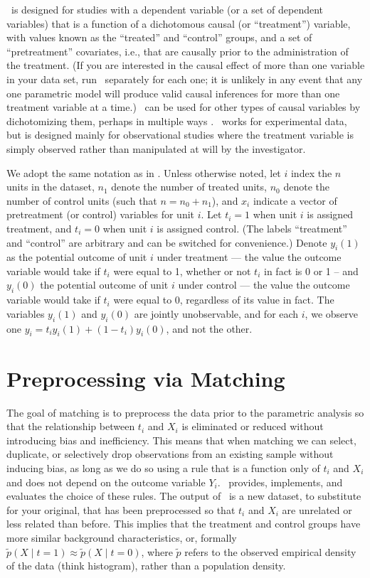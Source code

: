 
\MatchIt\ is designed for studies with a dependent variable (or a set
of dependent variables) that is a function of a dichotomous causal (or
``treatment'') variable, with values known as the ``treated'' and
``control'' groups, and a set of ``pretreatment'' covariates, i.e.,
that are causally prior to the administration of the treatment.  (If
you are interested in the causal effect of more than one variable in
your data set, run \MatchIt\ separately for each one; it is unlikely
in any event that any one parametric model will produce valid causal
inferences for more than one treatment variable at a time.)   \MatchIt\ can be used for
other types of causal variables by dichotomizing them, perhaps in
multiple ways \citep[see also][]{ImaDyk04}.
\MatchIt\ works for experimental data, but is designed mainly for observational
studies where the treatment variable is simply observed rather than
manipulated at will by the investigator. 

We adopt the same notation as in \citet*{HoImaKin05}. Unless otherwise
noted, let $i$ index the $n$ units in the dataset, $n_1$ denote the
number of treated units, $n_0$ denote the number of control units
(such that $n=n_0+n_1$), and $x_i$ indicate a vector of pretreatment
(or control) variables for unit $i$.  Let $t_i=1$ when unit $i$ is
assigned treatment, and $t_i=0$ when unit $i$ is assigned control.
(The labels ``treatment'' and ``control'' are arbitrary and can be
switched for convenience.)  Denote $y_i(1)$ as the potential outcome
of unit $i$ under treatment --- the value the outcome variable would
take if $t_i$ were equal to 1, whether or not $t_i$ in fact is 0 or 1
-- and $y_i(0)$ the potential outcome of unit $i$ under control ---
the value the outcome variable would take if $t_i$ were equal to 0,
regardless of its value in fact.  The variables $y_i(1)$ and $y_i(0)$
are jointly unobservable, and for each $i$, we observe one
$y_i=t_iy_i(1)+(1-t_i)y_i(0)$, and not the other.

\section{Preprocessing via Matching}

The goal of matching is to preprocess the data prior to the parametric
analysis so that the relationship between $t_i$ and $X_i$ is
eliminated or reduced without introducing bias and inefficiency.  This
means that when matching we can select, duplicate, or selectively drop
observations from an existing sample without inducing bias, as long as
we do so using a rule that is a function only of $t_i$ and $X_i$ and
does not depend on the outcome variable $Y_i$.  \MatchIt\ provides,
implements, and evaluates the choice of these rules.  The output of
\MatchIt\ is a new dataset, to substitute for your original, that has
been preprocessed so that $t_i$ and $X_i$ are unrelated or less
related than before.  This implies that the treatment and control
groups have more similar background characteristics, or, formally
$\tilde p(X\mid t=1) \approx \tilde p(X\mid t=0)$, where $\tilde p$
refers to the observed empirical density of the data (think
histogram), rather than a population density.

